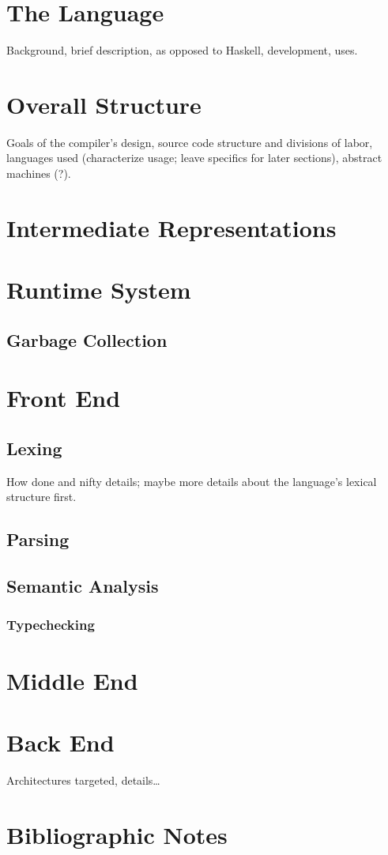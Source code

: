 \label{functional:ocaml}
\section{The Language}
Background, brief description, as opposed to Haskell, development, uses.

\section{Overall Structure}
Goals of the compiler's design, source code structure and divisions of labor, languages used (characterize usage; leave specifics for later sections), abstract machines (?).

\section{Intermediate Representations}

\section{Runtime System}

\subsection{Garbage Collection}

\section{Front End}
\subsection{Lexing}
How done and nifty details; maybe more details about the language's lexical structure first.

\subsection{Parsing}

\subsection{Semantic Analysis}

\subsubsection{Typechecking}

\section{Middle End}

\section{Back End}
Architectures targeted, details\dots

\section{Bibliographic Notes}